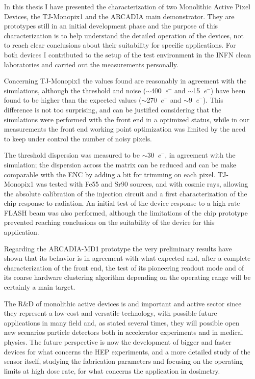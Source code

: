 In this thesis I have presented the characterization of two Monolithic Active Pixel Devices, the TJ-Monopix1 and the ARCADIA main demonstrator.
They are prototypes still in an initial development phase and the purpose of this characterization is to help understand the detailed operation of the devices, not to reach clear conclusions about their suitability for specific applications.
For both devices I contributed to the setup of the test environment in the INFN clean laboratories and carried out the measurements personally.

Concerning TJ-Monopix1 the values found are reasonably in agreement with the simulations, although the threshold and noise ($\sim$\SI{400}{\elementarycharge}$^-$ and $\sim$\SI{15}{\elementarycharge}$^-$) have been found to be higher than the expected values ($\sim$\SI{270}{\elementarycharge}$^-$ and $\sim$\SI{9}{\elementarycharge}$^-$).
This difference is not too surprising,  and can be justified considering that the simulations were performed with the front end in a optimized status, while in our measurements the front end working point optimization was limited by the need to keep under control the number of noisy pixels.

The threshold dispersion was measured to be $\sim$\SI{30}{\elementarycharge}$^-$, in agreement with the simulation; the dispersion across the matrix can be reduced and can be make comparable with the ENC by adding a bit for trimming on each pixel.
TJ-Monopix1 was tested with Fe55 and Sr90 sources, and with cosmic rays, allowing the absolute calibration of the injection circuit and a first characterization of the chip response to radiation.
An initial test of the device response to a high rate FLASH beam was also performed, although the limitations of the chip prototype prevented reaching conclusions on the suitability of the device for this application.


Regarding the ARCADIA-MD1 prototype the very preliminary results have shown that its behavior is in agreement with what expected and, after a complete characterization of the front end, the test of its pioneering readout mode and of its coarse hardware clustering algorithm depending on the operating range will be certainly a main target.

The R$\&$D of monolithic active devices is and important and active sector since they represent a low-cost and versatile technology, with possible future applications in many field and, as stated several times, they will possible open new scenarios particle detectors both in accelerator experiments and in medical physics.
The future perspective is now the development of bigger and faster devices for what concerns the HEP experiments, and a more detailed study of the sensor itself, studying the fabrication parameters and focusing on the operating limits at high dose rate, for what concerns the application in dosimetry.